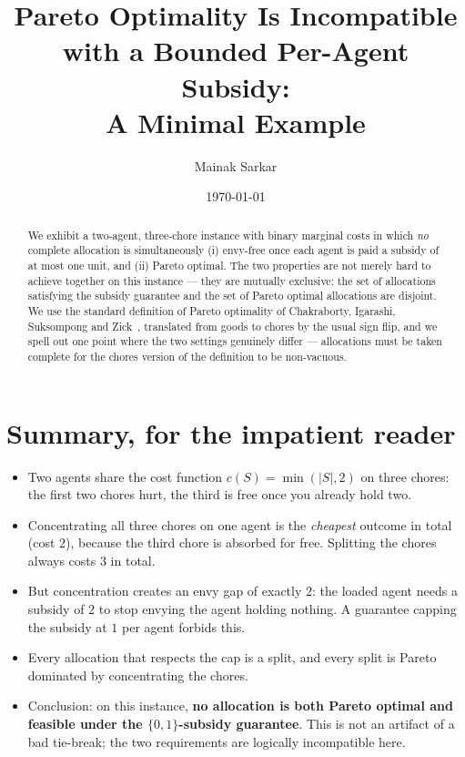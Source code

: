 \documentclass[11pt]{article}
\title{Pareto Optimality Is Incompatible with a Bounded Per-Agent Subsidy:\\
       A Minimal Example}
\author{Mainak Sarkar}
\date{\today}
\begin{document}
\maketitle

\begin{abstract}
We exhibit a two-agent, three-chore instance with binary marginal costs in
which \emph{no} complete allocation is simultaneously (i) envy-free once each
agent is paid a subsidy of at most one unit, and (ii) Pareto optimal. The two
properties are not merely hard to achieve together on this instance --- they
are mutually exclusive: the set of allocations satisfying the subsidy
guarantee and the set of Pareto optimal allocations are disjoint. We use the
standard definition of Pareto optimality of Chakraborty, Igarashi, Suksompong
and Zick~\cite{CISZ21}, translated from goods to chores by the usual sign
flip, and we spell out one point where the two settings genuinely differ ---
allocations must be taken complete for the chores version of the definition
to be non-vacuous.
\end{abstract}

\section{Summary, for the impatient reader}
\label{sec:summary}

\begin{itemize}[leftmargin=1.4em]
  \item Two agents share the cost function $c(S) = \min(|S|,2)$ on three
        chores: the first two chores hurt, the third is free once you already
        hold two.
  \item Concentrating all three chores on one agent is the \emph{cheapest}
        outcome in total (cost $2$), because the third chore is absorbed for
        free. Splitting the chores always costs $3$ in total.
  \item But concentration creates an envy gap of exactly $2$: the loaded
        agent needs a subsidy of $2$ to stop envying the agent holding
        nothing. A guarantee capping the subsidy at $1$ per agent forbids
        this.
  \item Every allocation that respects the cap is a split, and every split is
        Pareto dominated by concentrating the chores.
  \item Conclusion: on this instance, \textbf{no allocation is both Pareto
        optimal and feasible under the $\{0,1\}$-subsidy guarantee}. This is
        not an artifact of a bad tie-break; the two requirements are
        logically incompatible here.
\end{itemize}
\end{document}
